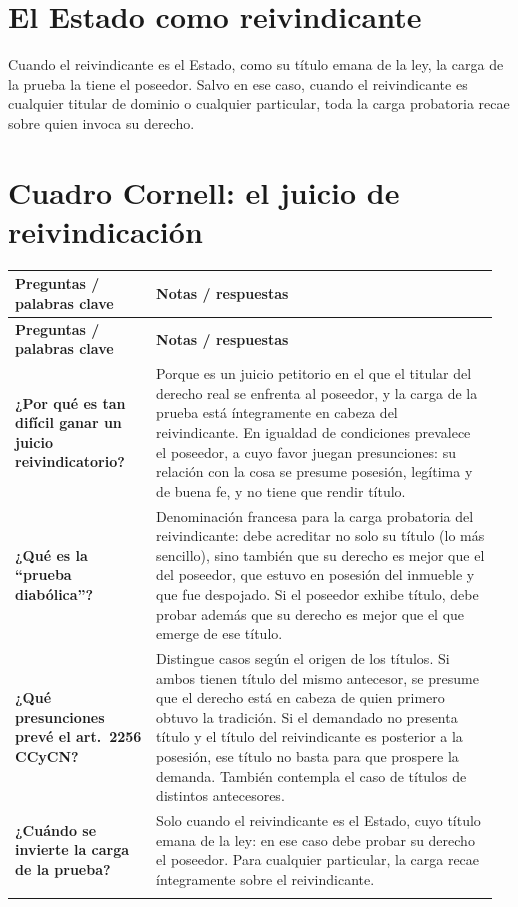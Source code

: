 \documentclass[12pt,oneside]{book}
\makeatletter
\newenvironment{cornell}{%
    \par\vspace{0.5em}
    \begin{longtable}{@{}>{\RaggedRight\arraybackslash}p{0.28\linewidth}
                         >{\RaggedRight\arraybackslash}p{0.68\linewidth}@{}}
    \toprule
    \textbf{Preguntas / palabras clave} & \textbf{Notas / respuestas} \\
    \midrule
    \endfirsthead
    \toprule
    \textbf{Preguntas / palabras clave} & \textbf{Notas / respuestas} \\
    \midrule
    \endhead
}{%
    \bottomrule
    \end{longtable}
}
\newcommand{\cornellsummary}[1]{%
    \midrule
    \multicolumn{2}{@{}p{\dimexpr0.96\linewidth+2\tabcolsep\relax}@{}}{%
        \textbf{Resumen:} #1} \\
}
\makeatother
\begin{document}
\section{El Estado como reivindicante}

Cuando el reivindicante es el Estado, como su título emana de la ley, la carga de la prueba la tiene el poseedor. Salvo en ese caso, cuando el reivindicante es cualquier titular de dominio o cualquier particular, toda la carga probatoria recae sobre quien invoca su derecho.

\section{Cuadro Cornell: el juicio de reivindicación}

\begin{cornell}
\textbf{¿Por qué es tan difícil ganar un juicio reivindicatorio?} &
Porque es un juicio petitorio en el que el titular del derecho real se enfrenta al poseedor, y la carga de la prueba está íntegramente en cabeza del reivindicante. En igualdad de condiciones prevalece el poseedor, a cuyo favor juegan presunciones: su relación con la cosa se presume posesión, legítima y de buena fe, y no tiene que rendir título. \\[0.6em]

\textbf{¿Qué es la ``prueba diabólica''?} &
Denominación francesa para la carga probatoria del reivindicante: debe acreditar no solo su título (lo más sencillo), sino también que su derecho es mejor que el del poseedor, que estuvo en posesión del inmueble y que fue despojado. Si el poseedor exhibe título, debe probar además que su derecho es mejor que el que emerge de ese título. \\[0.6em]

\textbf{¿Qué presunciones prevé el art.\ 2256 CCyCN?} &
Distingue casos según el origen de los títulos. Si ambos tienen título del mismo antecesor, se presume que el derecho está en cabeza de quien primero obtuvo la tradición. Si el demandado no presenta título y el título del reivindicante es posterior a la posesión, ese título no basta para que prospere la demanda. También contempla el caso de títulos de distintos antecesores. \\[0.6em]

\textbf{¿Cuándo se invierte la carga de la prueba?} &
Solo cuando el reivindicante es el Estado, cuyo título emana de la ley: en ese caso debe probar su derecho el poseedor. Para cualquier particular, la carga recae íntegramente sobre el reivindicante. \\

\cornellsummary{La reivindicación de inmuebles es un juicio petitorio de gran dificultad probatoria: el reivindicante debe probar su derecho, que es mejor que el del poseedor y que estuvo en posesión y fue despojado (prueba diabólica), mientras el poseedor goza de presunciones a su favor. El art.\ 2256 CCyCN prevé presunciones para aliviar esa carga, y solo cuando el reivindicante es el Estado la carga de la prueba recae en el poseedor.}
\end{cornell}
\end{document}
